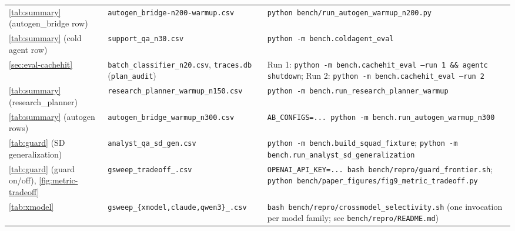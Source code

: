 \documentclass[sigconf,9pt]{acmart}
\begin{document}
\begin{table}[h]
\begin{tabularx}{\linewidth}{p{0.5cm} >{\raggedright\arraybackslash}X >{\raggedright\arraybackslash}X}
\addlinespace
\ref{tab:summary} (autogen\_bridge row) &
\texttt{autogen\_\allowbreak bridge-\allowbreak n200-\allowbreak warmup.csv} &
\texttt{python bench/run\_autogen\_warmup\_n200.py} \\

\addlinespace
\ref{tab:summary} (cold agent row) &
\texttt{support\_\allowbreak qa\_\allowbreak n30.csv} &
\texttt{python -m bench.coldagent\_\allowbreak eval} \\

\addlinespace
\ref{sec:eval-cachehit} &
\texttt{batch\_\allowbreak classifier\_\allowbreak n20.csv},
\texttt{traces.db} (\texttt{plan\_audit}) &
Run 1: \texttt{python -m bench.cachehit\_\allowbreak eval --run 1 \&\& agentc shutdown};
Run 2: \texttt{python -m bench.cachehit\_\allowbreak eval --run 2} \\

\addlinespace
\ref{tab:summary} (research\_planner) &
\texttt{research\_\allowbreak planner\_\allowbreak warmup\_\allowbreak n150.csv} &
\texttt{python -m bench.run\_\allowbreak research\_\allowbreak planner\_\allowbreak warmup} \\

\addlinespace
\ref{tab:summary} (autogen rows) &
\texttt{autogen\_\allowbreak bridge\_\allowbreak warmup\_\allowbreak n300.csv} &
\texttt{AB\_\allowbreak CONFIGS=...\ python -m bench.run\_\allowbreak autogen\_\allowbreak warmup\_\allowbreak n300} \\

\addlinespace
\ref{tab:guard} (SD generalization) &
\texttt{analyst\_\allowbreak qa\_\allowbreak sd\_\allowbreak gen.csv} &
\texttt{python -m bench.build\_\allowbreak squad\_\allowbreak fixture}; \texttt{python -m bench.run\_\allowbreak analyst\_\allowbreak sd\_\allowbreak generalization} \\

\addlinespace
\ref{tab:guard} (guard on/off), \ref{fig:metric-tradeoff} &
\texttt{gsweep\_\allowbreak tradeoff\_\allowbreak *.csv} &
\texttt{OPENAI\_\allowbreak API\_\allowbreak KEY=...\ bash bench/repro/guard\_\allowbreak frontier.sh};
\texttt{python bench/paper\_\allowbreak figures/fig9\_\allowbreak metric\_\allowbreak tradeoff.py} \\

\addlinespace
\ref{tab:xmodel} &
\texttt{gsweep\_\allowbreak \{xmodel,claude,qwen3\}\_\allowbreak *.csv} &
\texttt{bash bench/repro/crossmodel\_\allowbreak selectivity.sh} (one invocation per model family; see \texttt{bench/repro/README.md}) \\


\end{tabularx}
\end{table}
\end{document}

